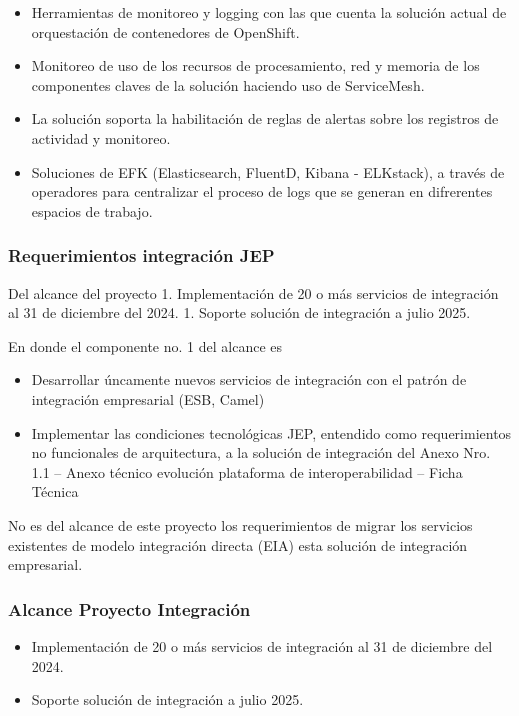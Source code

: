 \documentclass[
  paper=a4,
  ,captions=tableheading
]{scrartcl}
\providecommand{\tightlist}{%
  \setlength{\itemsep}{0pt}\setlength{\parskip}{0pt}}
\begin{document}
\begin{itemize}
\item
  Herramientas de monitoreo y logging con las que cuenta la solución
  actual de orquestación de contenedores de OpenShift.
\item
  Monitoreo de uso de los recursos de procesamiento, red y memoria de
  los componentes claves de la solución haciendo uso de ServiceMesh.
\item
  La solución soporta la habilitación de reglas de alertas sobre los
  registros de actividad y monitoreo.
\item
  Soluciones de EFK (Elasticsearch, FluentD, Kibana - ELKstack), a
  través de operadores para centralizar el proceso de logs que se
  generan en difrerentes espacios de trabajo.
\end{itemize}

\subsubsection{Requerimientos integración
JEP}\label{sec:requerimientos-integraciuxf3n-jep}

Del alcance del proyecto 1. Implementación de 20 o más servicios de
integración al 31 de diciembre del 2024. 1. Soporte solución de
integración a julio 2025.

En donde el componente no. 1 del alcance es

\begin{itemize}
\tightlist
\item
  Desarrollar úncamente nuevos servicios de integración con el patrón de
  integración empresarial (ESB, Camel)
\item
  Implementar las condiciones tecnológicas JEP, entendido como
  requerimientos no funcionales de arquitectura, a la solución de
  integración del Anexo Nro. 1.1 -- Anexo técnico evolución plataforma
  de interoperabilidad -- Ficha Técnica
\end{itemize}

No es del alcance de este proyecto los requerimientos de migrar los
servicios existentes de modelo integración directa (EIA) esta solución
de integración empresarial.

\subsubsection{Alcance Proyecto
Integración}\label{sec:alcance-proyecto-integraciuxf3n}

\begin{itemize}
\tightlist
\item
  Implementación de 20 o más servicios de integración al 31 de diciembre
  del 2024.
\item
  Soporte solución de integración a julio 2025.
\end{itemize}
\end{document}

